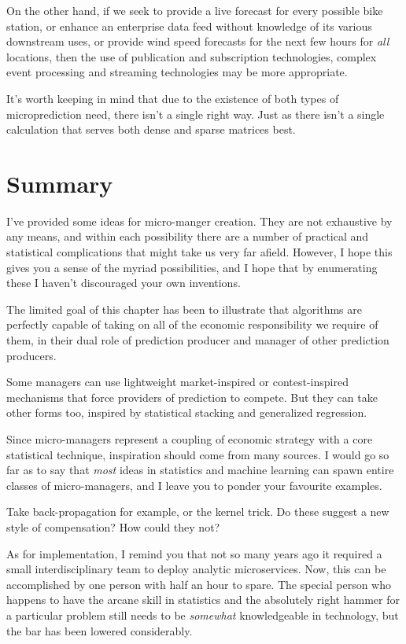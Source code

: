 On the other hand, if we seek to provide a live forecast for every possible bike station, or enhance an enterprise data feed without knowledge of its various downstream uses, or provide wind speed forecasts for the next few hours for {\em all} locations, then the use of publication and subscription technologies, complex event processing and streaming technologies may be more appropriate. 


It's worth keeping in mind that due to the existence of both types of microprediction need, there isn't a single right way.  Just as there isn't a single calculation that serves both dense and sparse matrices best. 


\section{Summary}


I've provided some ideas for micro-manger creation. They are not exhaustive by any means, and within each possibility there are a number of practical and statistical complications that might take us very far afield. However, I hope this gives you a sense of the myriad possibilities, and I hope that by enumerating these I haven't discouraged your own inventions. 


The limited goal of this chapter has been to illustrate that algorithms are perfectly capable of taking on all of the economic responsibility we require of them, in their dual role of prediction producer and manager of other prediction producers. 


Some managers can use lightweight market-inspired or contest-inspired mechanisms that force providers of prediction to compete. But they can take other forms too, inspired by statistical stacking and generalized regression.  


Since micro-managers represent a coupling of economic strategy with a core statistical technique, inspiration should come from many sources. I would go so far as to say that {\em most} ideas in statistics and machine learning can spawn entire classes of micro-managers, and I leave you to ponder your favourite examples. 

Take back-propagation for example, or the kernel trick. Do these suggest a new style of compensation? How could they not? 

As for implementation, I remind you that not so many years ago it required a small interdisciplinary team to deploy analytic microservices. Now, this can be accomplished by one person with half an hour to spare. The special person who happens to have the arcane skill in statistics and the absolutely right hammer for a particular problem still needs to be {\em somewhat} knowledgeable in technology, but the bar has been lowered considerably.



















